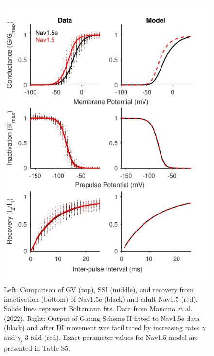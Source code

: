 \begin{figure}[t]
\begin{minipage}[c]{85mm}
    \centering
    \includegraphics[width=\textwidth]{Figures/AppendixA/figure11.pdf}
\end{minipage}\hfill
\begin{minipage}[c]{70mm}
    \caption{
Left: Comparison of GV (top), SSI (middle), and recovery from inactivation (bottom) of Nav1.5e (black) and adult Nav1.5 (red). Solids lines represent Boltzmann fits. Data from Mancino et al. (2022).  Right: Output of Gating Scheme II fitted to Nav1.5e data (black) and after DI movement was facilitated by increasing rates $\gamma$ and $\gamma_i$ 3-fold (red). Exact parameter values for Nav1.5 model are presented in Table S5.}
\label{fig:A11}
\end{minipage}
\end{figure}

